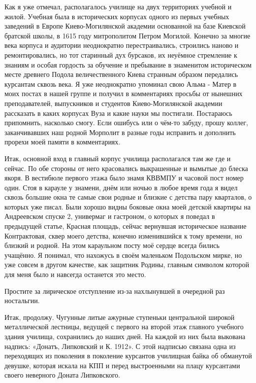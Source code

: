 Как я уже отмечал, располагалось училище на
двух территориях учебной и жилой. Учебная была в исторических корпусах одного
из первых учебных заведений в Европе Киево-Могилянской академии основанной
на базе Киевской братской школы, в 1615 году митрополитом Петром Могилой.
Конечно за многие века корпуса и аудитории неоднократно перестраивались,
строились наново и ремонтировались, но тот старинный дух бурсаков, их неуёмное
стремление к знаниям и особая гордость за обучение и пребывание в знаменитом
историческом месте древнего Подола величественного Киева странным образом
передались курсантам сквозь века. Я уже неоднократно упоминал свою Альма -
Матер в моих постах в нашей группе и получил в комментариях просьбы от нынешних
преподавателей, выпускников и студентов Киево-Могилянской академии
рассказать в каких корпусах Вуза и какие науки мы постигали. Постараюсь
припомнить, насколько смогу. Если ошибусь или о чём-то забуду, прошу коллег,
заканчивавших наш родной Морполит в разные годы исправить и дополнить прорехи
моей памяти в комментариях. 

Итак, основной вход в главный корпус училища располагался там же где и сейчас.
По обе стороны от него красовались выкрашенные и вымытые до блеска якоря. В
вестибюле первого этажа было знамя КВВМПУ и часовой пост номер один. Стоя в
карауле у знамени, днём или ночью в любое время года я видел сквозь большие
окна те самые свои родные и близкие с детства пару кварталов, о которых уже
писал. Были хорошо видны боковые окна моей детской квартиры на Андреевском
спуске 2, универмаг и гастроном, о которых я поведал в предыдущей статье,
Красная площадь, сейчас вернувшая историческое название Контрактовая, сквер
моего детства, конечно изменившийся к тому времени, но близкий и родной. На
этом караульном посту моё сердце всегда бились учащённо. Я понимал, что
нахожусь в своём маленьком Подольском мирке, но уже совсем в другом качестве,
как защитник Родины, главным символом которой для меня было и навсегда
останется это место. 

Простите за лирическое отступление
из-за нахлынувшей в очередной раз ностальгии. 

Итак, продолжу. Чугунные литые
ажурные ступеньки центральной широкой металлической лестницы, ведущей с первого
на второй этаж главного учебного здания училища, сохранились до наших дней. На
каждой из них была выкована надпись: «Донатъ, Липковский и К. 1912». С этой
надписью связана одна из переходящих из поколения в поколение курсантов
училищная байка об обманутой девушке, которая искала на КПП и перед
выстроенными на плацу курсантами своего неверного Доната Липковского. 

